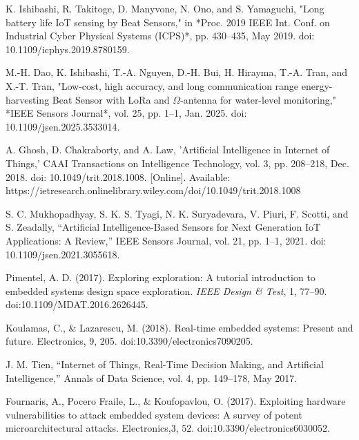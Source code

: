 \begin{thebibliography}{00}
K. Ishibashi, R. Takitoge, D. Manyvone, N. Ono, and S. Yamaguchi, 
"Long battery life IoT sensing by Beat Sensors," 
in *Proc. 2019 IEEE Int. Conf. on Industrial Cyber Physical Systems (ICPS)*, pp. 430--435, May 2019. doi: 10.1109/icphys.2019.8780159.

M.-H. Dao, K. Ishibashi, T.-A. Nguyen, D.-H. Bui, H. Hirayma, T.-A. Tran, and X.-T. Tran, 
"Low-cost, high accuracy, and long communication range energy-harvesting Beat Sensor with LoRa and $\Omega$-antenna for water-level monitoring,"
*IEEE Sensors Journal*, vol. 25, pp. 1--1, Jan. 2025. doi: 10.1109/jsen.2025.3533014.

 A. Ghosh, D. Chakraborty, and A. Law, 
'Artificial Intelligence in Internet of Things,' 
CAAI Transactions on Intelligence Technology, vol. 3, pp. 208--218, Dec. 2018. doi: 10.1049/trit.2018.1008. [Online]. Available: https://ietresearch.onlinelibrary.wiley.com/doi/10.1049/trit.2018.1008

 S. C. Mukhopadhyay, S. K. S. Tyagi, N. K. Suryadevara, V. Piuri, F. Scotti, and S. Zeadally, 
``Artificial Intelligence-Based Sensors for Next Generation IoT Applications: A Review,'' 
IEEE Sensors Journal, vol. 21, pp. 1--1, 2021. doi: 10.1109/jsen.2021.3055618.

Pimentel, A. D. (2017). Exploring exploration: A tutorial introduction to embedded systems design space exploration. \textit{IEEE Design \& Test}, 1, 77--90. doi:10.1109/MDAT.2016.2626445.

Koulamas, C., \& Lazarescu, M. (2018). Real-time embedded systems: Present and future. Electronics, 9, 205. doi:10.3390/electronics7090205.

 J. M. Tien, 
``Internet of Things, Real-Time Decision Making, and Artificial Intelligence,'' 
Annals of Data Science, vol. 4, pp. 149--178, May 2017.

Fournaris, A., Pocero Fraile, L., \& Koufopavlou, O. (2017). Exploiting hardware vulnerabilities to attack embedded system devices: A survey of potent microarchitectural attacks. Electronics,3, 52. doi:10.3390/electronics6030052.


\end{thebibliography}

